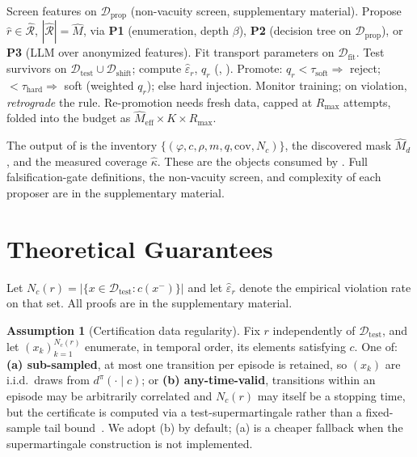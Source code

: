 \documentclass[letterpaper]{article} %
\let\autoref\Cref
\theoremstyle{plain}
\theoremstyle{definition}
\newtheorem{assumption}{Assumption}[section] %
\theoremstyle{remark}
\begin{document}
\begin{algorithm}[t]
  \caption{Discover, falsify, inject}
  \label{alg:main}
  \begin{algorithmic}[1]
    \STATE Screen features on $\mathcal{D}_{\mathrm{prop}}$ (non-vacuity screen, supplementary material).
    \STATE Propose $\hat{r}\in\hat{\mathcal{R}}$, $|\hat{\mathcal{R}}|=\hat M$, via \textbf{P1} (enumeration, depth $\beta$), \textbf{P2} (decision tree on $\mathcal{D}_{\mathrm{prop}}$), or \textbf{P3} (LLM over anonymized features).
    \STATE Fit transport parameters on $\mathcal{D}_{\mathrm{fit}}$.
    \STATE Test survivors on $\mathcal{D}_{\mathrm{test}}\cup\mathcal{D}_{\mathrm{shift}}$; compute $\hat\varepsilon_r$, $q_r$ (\autoref{thm:t1}, \autoref{thm:t2}).
    \ENDFOR
    \STATE Promote: $q_r<\tau_{\mathrm{soft}}\Rightarrow$ reject; $<\tau_{\mathrm{hard}}\Rightarrow$ soft (weighted $q_r$); else hard injection.
    \STATE Monitor training; on violation, \emph{retrograde} the rule. Re-promotion needs fresh data, capped at $R_{\max}$ attempts, folded into the budget as $\hat M_{\mathrm{eff}}\times K\times R_{\max}$.
  \end{algorithmic}
\end{algorithm}

The output of \autoref{alg:main} is the inventory $\{(\varphi,c,\rho,m,q,\mathrm{cov},N_c)\}$, the discovered mask $\hat M_d$, and the measured coverage $\hat\kappa$. These are the objects consumed by \autoref{sec:injection}. Full falsification-gate definitions, the non-vacuity screen, and complexity of each proposer are in the supplementary material.

\section{Theoretical Guarantees}
\label{sec:theory}

Let $N_c(r)=|\{x\in\mathcal{D}_{\mathrm{test}}: c(x^-)\}|$ and let $\hat\varepsilon_r$ denote the empirical violation rate on that set. All proofs are in the supplementary material.

\begin{assumption}[Certification data regularity]
  \label{ass:regularity}
  Fix $r$ independently of $\mathcal{D}_{\mathrm{test}}$, and let $(x_k)_{k=1}^{N_c(r)}$ enumerate, in temporal order, its elements satisfying $c$. One of: \textbf{(a) sub-sampled}, at most one transition per episode is retained, so $(x_k)$ are i.i.d.\ draws from $d^\pi(\cdot\mid c)$; or \textbf{(b) any-time-valid}, transitions within an episode may be arbitrarily correlated and $N_c(r)$ may itself be a stopping time, but the certificate is computed via a test-supermartingale rather than a fixed-sample tail bound~\cite{howard2020timeuniform}. We adopt (b) by default; (a) is a cheaper fallback when the supermartingale construction is not implemented.
\end{assumption}
\end{document}

